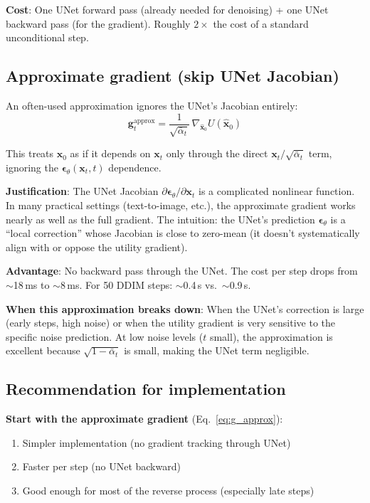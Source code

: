 \documentclass[11pt]{article}
\newcommand{\xb}{\mathbf{x}}
\newcommand{\eb}{\boldsymbol{\epsilon}}
\newcommand{\gb}{\mathbf{g}}
\newcommand{\alphabar}{\bar{\alpha}}
\begin{document}
\textbf{Cost}: One UNet forward pass (already needed for denoising) + one UNet backward
pass (for the gradient). Roughly $2\times$ the cost of a standard unconditional step.

\subsection{Approximate gradient (skip UNet Jacobian)}
\label{sec:approx_grad}

An often-used approximation ignores the UNet's Jacobian entirely:
\begin{equation}
    \gb_t^{\text{approx}}
    = \frac{1}{\sqrt{\alphabar_t}}\, \nabla_{\hat{\xb}_0} U(\hat{\xb}_0)
    \label{eq:g_approx}
\end{equation}

This treats $\hat{\xb}_0$ as if it depends on $\xb_t$ only through the direct
$\xb_t / \sqrt{\alphabar_t}$ term, ignoring the $\eb_\theta(\xb_t, t)$ dependence.

\textbf{Justification}: The UNet Jacobian $\partial \eb_\theta / \partial \xb_t$
is a complicated nonlinear function. In many practical settings (text-to-image, etc.),
the approximate gradient works nearly as well as the full gradient. The intuition:
the UNet's prediction $\eb_\theta$ is a ``local correction'' whose Jacobian is
close to zero-mean (it doesn't systematically align with or oppose the utility gradient).

\textbf{Advantage}: No backward pass through the UNet. The cost per step drops from
$\sim$18\,ms to $\sim$8\,ms. For 50 DDIM steps: $\sim$0.4\,s vs.\ $\sim$0.9\,s.

\textbf{When this approximation breaks down}: When the UNet's correction is large
(early steps, high noise) or when the utility gradient is very sensitive to the
specific noise prediction. At low noise levels ($t$ small), the approximation is
excellent because $\sqrt{1-\alphabar_t}$ is small, making the UNet term negligible.

\subsection{Recommendation for implementation}

\textbf{Start with the approximate gradient} (Eq.~\eqref{eq:g_approx}):
\begin{enumerate}[nosep]
    \item Simpler implementation (no gradient tracking through UNet)
    \item Faster per step (no UNet backward)
    \item Good enough for most of the reverse process (especially late steps)
\end{enumerate}
\end{document}
